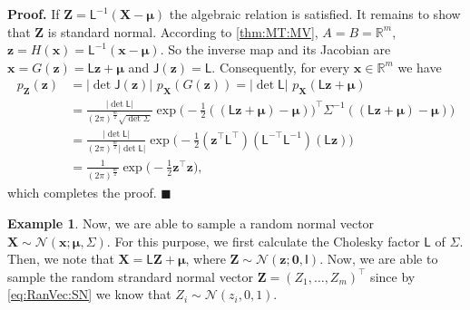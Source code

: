 \documentclass[10pt]{article}
\theoremstyle{definition}
\newtheorem{exmp}{Example}[section]
\newenvironment{prf}{\noindent\textbf{Proof.}}{\hfill$\blacksquare$}
\begin{document}
\begin{prf}
If $\mathbf{Z}=\mathsf{L}^{-1}(\mathbf{X}-\boldsymbol{\mu})$ the algebraic relation is satisfied. It remains to show that $\mathbf{Z}$ is standard normal. According to \cref{thm:MT:MV}, $A=B=\mathbb{R}^m$, $\mathbf{z}=H(\mathbf{x})=\mathsf{L}^{-1}(\mathbf{x}-\boldsymbol{\mu})$. So the inverse map and its Jacobian are  $\mathbf{x}=G(\mathbf{z})=\mathsf{L}\mathbf{z}+\boldsymbol{\mu}$ and $\mathsf{J}(\mathbf{z}) = \mathsf{L}$. Consequently, for every $\mathbf{x}\in\mathbb{R}^m$ we have
\begin{align*}
p_{\mathbf{Z}}(\mathbf{z}) &= |\det\mathsf{J}(\mathbf{z})| \,\, p_{\mathbf{X}}(G(\mathbf{z}))  = |\det\mathsf{L}|\,\, p_{\mathbf{X}}(\mathsf{L}\mathbf{z}+\boldsymbol{\mu}) \\
&= \frac{|\det\mathsf{L}|}{(2\pi)^{\frac{m}{2}} \sqrt{\det\mathsf{\Sigma}}} \exp \Big(-\frac{1}{2} ((\mathsf{L}\mathbf{z}+\boldsymbol{\mu})-\boldsymbol{\mu}))^{\top}\mathsf{\Sigma}^{-1}((\mathsf{L}\mathbf{z}+\boldsymbol{\mu})-\boldsymbol{\mu}) \Big)\\
&= \frac{|\det\mathsf{L}|}{(2\pi)^{\frac{m}{2}}|\det\mathsf{L}|} \exp \Big(-\frac{1}{2} (\mathbf{z}^{\top}\mathsf{L}^{\top})(\mathsf{L}^{-\top} \mathsf{L}^{-1})(\mathsf{L}\mathbf{z}) \Big)\\
&=\frac{1}{(2\pi)^{\frac{m}{2}}} \exp \Big(-\frac{1}{2} \mathbf{z}^{\top} \mathbf{z} \Big),
\end{align*}
which completes the proof.
\end{prf}
\begin{exmp}
Now, we are able to sample a random normal vector $\mathbf{X}\sim\mathcal{N}(\mathbf{x}; \boldsymbol{\mu}, \mathsf{\Sigma})$. For this purpose, we first calculate the Cholesky factor $\mathsf{L}$ of $\mathsf{\Sigma}$. Then, we note that $\mathbf{X} = \mathsf{L} \mathbf{Z} + \boldsymbol{\mu}$, where $\mathbf{Z}\sim\mathcal{N}(\mathbf{z}; \mathbf{0}, \mathsf{I})$. Now, we are able to sample the random strandard normal vector $\mathbf{Z}=(Z_1,\dots,Z_m)^{\top}$ since by \cref{eq:RanVec:SN} we know that $Z_i\sim\mathcal{N}(z_i, 0, 1)$.
\label{exmp:sample}
\end{exmp}
\end{document}
